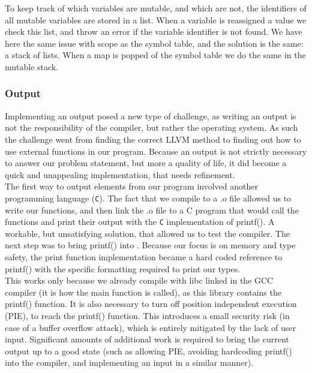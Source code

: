 To keep track of which variables are mutable, and which are not, the identifiers of all mutable variables are stored in a list. When a variable is reassigned a value we check this list, and throw an error if the variable identifier is not found. We have here the same issue with scope as the symbol table, and the solution is the same: a stack of lists. When a map is popped of the symbol table we do the same in the mutable stack.

\subsubsection{Output}
\label{sec:Output}
Implementing an output posed a new type of challenge, as writing an output is not the responsibility of the compiler, but rather the operating system. As such the challenge went from finding the correct LLVM method to finding out how to use external functions in our program. Because an output is not strictly necessary to answer our problem statement, but more a quality of life, it did become a quick and unappealing implementation, that needs refinement.\\

The first way to output elements from our  program involved another programming
language (\texttt{C}). The fact that we compile to a .o file allowed us to write our
functions, and then link the .o file to a C program that would call the \lang{}
functions and print their output with the \texttt{C} implementation of printf(). A workable, but unsatisfying solution, that allowed us to test the compiler. The next step was to bring printf() into \lang. Because our focus is on memory and type safety, the print function implementation became a hard coded reference to printf() with the specific formatting required to print our types.\\

This works only because we already compile with libc linked in the GCC compiler (it
is how the main function is called), as this library contains the printf() function.
It is also necessary to turn off position independent execution (PIE), to reach the
printf() function. This introduces a small security risk (in case of a buffer
overflow attack), which is entirely mitigated by the lack of user input. Significant
amounts of additional work is required to bring the current output up to a good state
(such as allowing PIE, avoiding hardcoding printf() into the compiler, and implementing an input in a similar manner).

